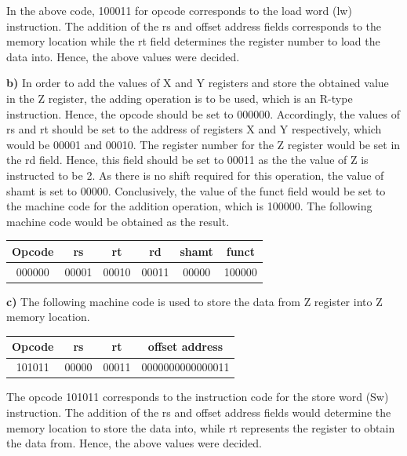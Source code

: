 \documentclass[12pt,a4paper]{article}
\begin{document}
	\noindent In the above code, 100011 for opcode corresponds to the load word (lw) instruction. The addition of the rs and offset address fields corresponds to the memory location while the rt field determines the register number to load the data into. Hence, the above values were decided.
	
	\vspace{0.4cm}
	\noindent \textbf{ b)}  In order to add the values of X and Y registers and store the obtained value in the Z register, the adding operation is to be used, which is an R-type instruction. Hence, the opcode should be set to 000000. Accordingly, the values of rs and rt should be set to the address of registers X and Y respectively, which would be 00001 and 00010. The register number for the Z register would be set in the rd field. Hence, this field should be set to 00011 as the the value of Z is instructed to be 2. As there is no shift required for this operation, the value of shamt is set to 00000. Conclusively, the value of the funct field would be set to the machine code for the addition operation, which is 100000. 
	The following machine code would be obtained as the result.
	
	\begin{table}[H]
		\centering
		\begin{tabular}{|c | c| c| c|c|c|}
			\hline
			\textbf{Opcode} & \textbf{rs} & \textbf{rt} & \textbf{rd}& \textbf{shamt}& \textbf{funct}\\ \hline
			000000& 00001 & 00010 &00011&00000&100000 \\\hline
		\end{tabular}
	\end{table}

	\vspace{0.4cm}
	\noindent \textbf{ c)} The following machine code is used to store the data from Z register into Z memory location.
	
	\begin{table}[H]
		\centering
		\begin{tabular}{|c | c| c| c|}
			\hline
			\textbf{Opcode} & \textbf{rs} & \textbf{rt}& \textbf{offset address}\\ \hline
			101011& 00000 & 00011 & 0000000000000011\\\hline
		\end{tabular}
	\end{table}
	
	\noindent The opcode 101011 corresponds to the instruction code for the store word (Sw) instruction. The addition of the rs and offset address fields would determine the memory location to store the data into, while rt represents the register to obtain the data from. Hence, the above values were decided. 
	
\end{document}
